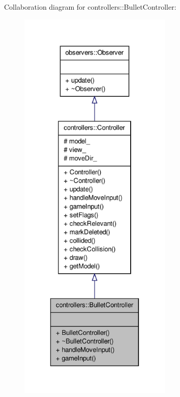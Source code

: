\-Collaboration diagram for controllers\-:\-:\-Bullet\-Controller\-:\nopagebreak
\begin{figure}[H]
\begin{center}
\leavevmode
\includegraphics[height=550pt]{d0/d11/classcontrollers_1_1BulletController__coll__graph}
\end{center}
\end{figure}
